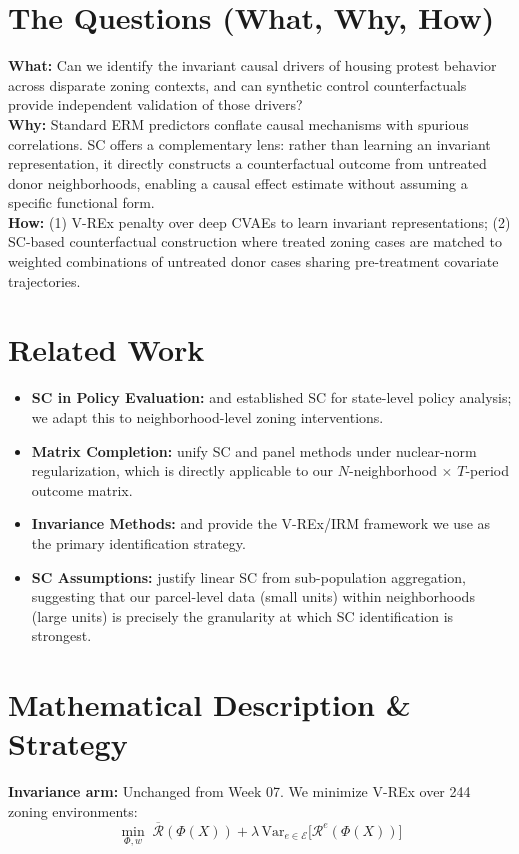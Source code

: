 \documentclass[11pt,twoside]{article}
\begin{document}
\section*{The Questions (What, Why, How)}
\textbf{What:} Can we identify the invariant causal drivers of housing protest behavior across disparate zoning contexts, and can synthetic control counterfactuals provide independent validation of those drivers? \\
\textbf{Why:} Standard ERM predictors conflate causal mechanisms with spurious correlations. SC offers a complementary lens: rather than learning an invariant representation, it directly constructs a counterfactual outcome from untreated donor neighborhoods, enabling a causal effect estimate without assuming a specific functional form. \\
\textbf{How:} (1) V-REx penalty over deep CVAEs to learn invariant representations; (2) SC-based counterfactual construction where treated zoning cases are matched to weighted combinations of untreated donor cases sharing pre-treatment covariate trajectories.

\section*{Related Work}
\begin{itemize}
    \item \textbf{SC in Policy Evaluation:} \citet{abadie2010sc} and \citet{abadie2021sc} established SC for state-level policy analysis; we adapt this to neighborhood-level zoning interventions.
    \item \textbf{Matrix Completion:} \citet{athey2021mc} unify SC and panel methods under nuclear-norm regularization, which is directly applicable to our $N$-neighborhood $\times$ $T$-period outcome matrix.
    \item \textbf{Invariance Methods:} \citet{krueger2021rex} and \citet{arjovsky2019irm} provide the V-REx/IRM framework we use as the primary identification strategy.
    \item \textbf{SC Assumptions:} \citet{shi2022sc} justify linear SC from sub-population aggregation, suggesting that our parcel-level data (small units) within neighborhoods (large units) is precisely the granularity at which SC identification is strongest.
\end{itemize}

\section*{Mathematical Description \& Strategy}
\textbf{Invariance arm:} Unchanged from Week 07. We minimize V-REx over 244 zoning environments:
\[
  \min_{\Phi, w}\;\overline{\mathcal{R}}(\Phi(X)) + \lambda\,\mathrm{Var}_{e\in\mathcal{E}}\bigl[\mathcal{R}^e(\Phi(X))\bigr]
\]
\end{document}
